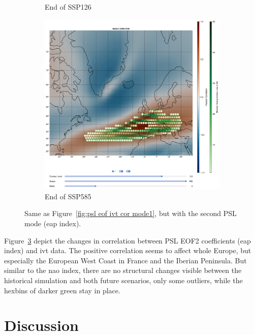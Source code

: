 \begin{figure}[!htb]
\begin{subfigure}[b]{0.32\textwidth}
    \caption{End of SSP126} 
    \label{fig:psl eof ivt cor ssp126 mode2}
  \end{subfigure}
  \begin{subfigure}[b]{0.32\textwidth}
    \includegraphics[width=\textwidth]{figures/psl_ivt_cor_mode2_ssp585.png}
    \caption{End of SSP585}
    \label{fig:psl eof ivt cor ssp585 mode2}
  \end{subfigure}
  \caption{Same as Figure~\ref{fig:psl eof ivt cor mode1}, but with the second PSL mode (\ac{eap} index).}
  \label{fig:psl eof ivt cor mode2}
\end{figure}

Figure~\ref{fig:psl eof ivt cor mode2} depict the changes in correlation between PSL EOF2 coefficients (\ac{eap} index) and \ac{ivt} data. 
The positive correlation seems to affect whole Europe, but especially the European West Coast in France and the Iberian Peninsula. 
But similar to the \ac{nao} index, there are no structural changes visible between the historical simulation and both future scenarios, only some outliers, while the hexbins of darker green stay in place.

\section{Discussion}
\label{sec:discussion}

